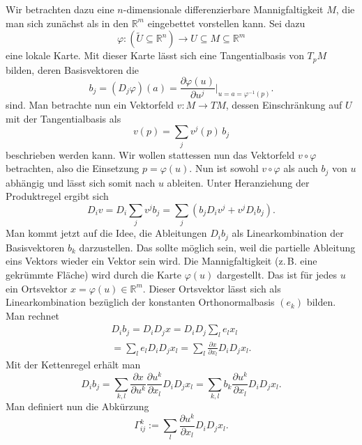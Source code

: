 \documentclass[a4paper,10pt,fleqn,twocolumn,twoside]{article}
\newcommand{\R}{\mathbb R}
\begin{document}
Wir betrachten dazu eine $n$-dimensionale differenzierbare
Mannigfaltigkeit $M$, die man sich zunächst als in den $\R^m$ eingebettet
vorstellen kann. Sei dazu
\begin{equation}
\varphi\colon (\tilde U\subseteq \R^n)\to U\subseteq M\subseteq\R^m
\end{equation}
eine lokale Karte. Mit dieser Karte lässt sich eine Tangentialbasis
von $T_p M$ bilden, deren Basisvektoren die%
\begin{equation}
b_j = (D_j\varphi)(a)
= \frac{\partial\varphi(u)}{\partial u^j}\bigg|_{u=a=\varphi^{-1}(p)}.
\end{equation}
sind. Man betrachte nun ein Vektorfeld $v\colon M\to TM$, dessen
Einschränkung auf $U$ mit der Tangentialbasis als
\begin{equation}
v(p) = \sum_{j} v^j(p)\,b_j
\end{equation}
beschrieben werden kann. Wir wollen stattessen nun das Vektorfeld
$v\circ\varphi$ betrachten, also die Einsetzung $p=\varphi(u)$.
Nun ist sowohl $v\circ\varphi$ als auch $b_j$ von $u$ abhängig
und lässt sich somit nach $u$ ableiten. Unter Heranziehung der
Produktregel ergibt sich
\begin{equation}
D_i v = D_i\sum_{j}v^j b_j
= \sum_{j}(b_jD_i v^j+v^jD_i b_j).
\end{equation}
Man kommt jetzt auf die Idee, die Ableitungen $D_ib_j$ als
Linearkombination der Basisvektoren $b_k$ darzustellen. Das sollte
möglich sein, weil die partielle Ableitung eins Vektors wieder ein
Vektor sein wird. Die Mannigfaltigkeit (z.\,B. eine gekrümmte Fläche)
wird durch die Karte $\varphi(u)$ dargestellt. Das ist für jedes
$u$ ein Ortsvektor $x=\varphi(u)\in\R^m$. Dieser Ortsvektor lässt
sich als Linearkombination bezüglich der konstanten
Orthonormalbasis $(e_k)$ bilden. Man rechnet
\begin{gather}
D_i b_j = D_i D_j x = D_i D_j\sum_{l} e_l x_l\\
= \sum_{l}e_l D_i D_j x_l
= \sum_{l}\frac{\partial x}{\partial x_l}D_i D_j x_l.
\end{gather}
Mit der Kettenregel erhält man
\begin{equation}
D_ib_j = \sum_{k,l}\frac{\partial x}{\partial u^k}
\frac{\partial u^k}{\partial x_l}D_iD_j x_l
= \sum_{k,l}b_k\frac{\partial u^k}{\partial x_l}D_iD_j x_l.
\end{equation}
Man definiert nun die Abkürzung
\begin{equation}
\Gamma_{ij}^k := \sum_{l}\frac{\partial u^k}
{\partial x_l}D_iD_j x_l.
\end{equation}
\end{document}
